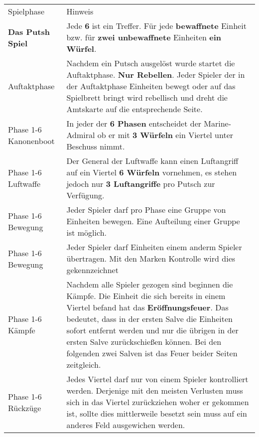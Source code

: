 \documentclass[5pt]{article}
\begin{document}
 \begin{tabular}{p{4cm}p{14.5cm}}
 	\toprule
	\addlinespace
    		Spielphase & Hinweis \\
	\addlinespace
    	
	\midrule
    	
	\textbf{Das Putsh Spiel }    		&	Jede \textbf{6} ist ein Treffer. Für jede \textbf{bewaffnete} Einheit  bzw. für \textbf{zwei unbewaffnete} Einheiten \textbf{ein Würfel}. \\
  	\addlinespace
     	
	Auftaktphase 				& 	Nachdem ein Putsch ausgelöst wurde startet die Auftaktphase. \textbf{Nur Rebellen}. Jeder Spieler der in der Auftaktphase Einheiten bewegt oder auf das Spielbrett bringt wird rebellisch und dreht die Amtskarte auf die entsprechende Seite.    \\

	Phase 1-6 Kanonenboot		& 	In jeder der \textbf{6 Phasen} entscheidet der Marine-Admiral ob er mit \textbf{3 Würfeln} ein Viertel unter Beschuss nimmt. \\
	
	Phase 1-6 Luftwaffe			& 	Der General der Luftwaffe kann einen Luftangriff auf ein Viertel \textbf{6 Würfeln} vornehmen, 
								es stehen jedoch nur \textbf{3 Luftangriffe} pro Putsch zur Verfügung.  \\
								
	Phase 1-6 Bewegung		&	Jeder Spieler darf pro Phase eine Gruppe von Einheiten bewegen. Eine Aufteilung einer Gruppe ist möglich. \\

	Phase 1-6 Bewegung		&	Jeder Spieler darf Einheiten einem anderm Spieler übertragen. Mit den Marken Kontrolle wird dies gekennzeichnet \\
	
	Phase 1-6 Kämpfe 			&	Nachdem alle Spieler gezogen sind beginnen die Kämpfe. Die Einheit die sich bereits in einem Viertel befand hat das \textbf{Eröffnungsfeuer}. Das bedeutet, dass in der ersten Salve die Einheiten sofort entfernt werden und nur die übrigen in der ersten Salve zurückschießen können. Bei den folgenden zwei Salven ist das Feuer beider Seiten zeitgleich.\\
	
	Phase 1-6 Rückzüge			&	Jedes Viertel darf nur von einem Spieler kontrolliert werden. Derjenige mit den meisten Verlusten muss sich in das Viertel zurückziehen woher er gekommen ist, sollte dies mittlerweile besetzt sein muss auf ein anderes Feld ausgewichen werden. \\
	

\end{tabular}
\end{document}
